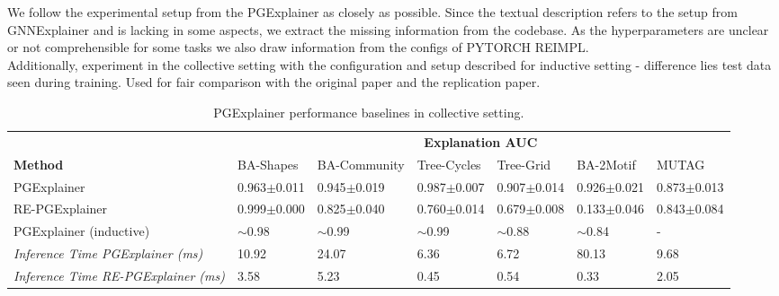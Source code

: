 We follow the experimental setup from the PGExplainer as closely as possible. Since the textual description refers to the setup from GNNExplainer and is lacking in some aspects, we extract the missing information from the codebase. As the hyperparameters are unclear or not comprehensible for some tasks we also draw information from the configs of PYTORCH REIMPL. \\



Additionally, experiment in the collective setting with the configuration and setup described for inductive setting - difference lies test data seen during training. Used for fair comparison with the original paper and the replication paper.

\begin{table}[ht]
    \centering
    \scriptsize
    \begin{tabularx}{\textwidth}{l*{6}{X}}   %
    \toprule
    \textbf{} & \multicolumn{6}{c}{\textbf{Explanation AUC}} \\
    \cmidrule{2-7}
    \textbf{Method} & BA-Shapes & BA-Community & Tree-Cycles & Tree-Grid & BA-2Motif & MUTAG \\
    \midrule
    PGExplainer & 0.963$\pm$0.011 & 0.945$\pm$0.019 & 0.987$\pm$0.007 & 0.907$\pm$0.014 & 0.926$\pm$0.021 & 0.873$\pm$0.013 \\
    \midrule
    RE-PGExplainer & 0.999$\pm$0.000 & 0.825$\pm$0.040 & 0.760$\pm$0.014 & 0.679$\pm$0.008 & 0.133$\pm$0.046 & 0.843$\pm$0.084 \\
    \midrule
    PGExplainer (inductive) & $\sim$0.98 & $\sim$0.99 & $\sim$0.99 & $\sim$0.88 & $\sim$0.84 & - \\
    \midrule
    \textit{Inference Time PGExplainer (ms)} & 10.92 & 24.07 & 6.36 & 6.72 & 80.13 & 9.68 \\
    \textit{Inference Time RE-PGExplainer (ms)} & 3.58 & 5.23 & 0.45 & 0.54 & 0.33 & 2.05 \\
    \bottomrule
    \end{tabularx}
    \caption[Baseline PGExplainer and RE-PGExplainer]{PGExplainer performance baselines in collective setting.}
    \label{tab:pgexplainer_auc}
\end{table}

